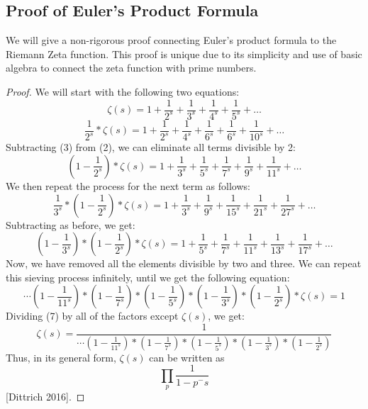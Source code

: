 \documentclass[11pt]{article}
\newcommand\ddfrac[2]{\frac{\displaystyle #1}{\displaystyle #2}}
\begin{document}
\subsection{Proof of Euler's Product Formula}
We will give a non-rigorous proof connecting Euler's product formula to the Riemann Zeta function. This proof is unique due to its simplicity and use of basic algebra to connect the zeta function with prime numbers.
\begin{proof}
We will start with the following two equations:
\begin{equation}  
\zeta(s) = 1 + \frac{1}{2^s} + \frac{1}{3^s} + \frac{1}{4^s} + \frac{1}{5^s} + \ldots
\end{equation}
\begin{equation}  
\frac{1}{2^s}*\zeta(s) = 1 + \frac{1}{2^s} + \frac{1}{4^s} + \frac{1}{6^s} + \frac{1}{6^s} + \frac{1}{10^s}+ \ldots
\end{equation}
Subtracting (3) from (2), we can eliminate all terms divisible by 2:
\begin{equation}  
\left(1-\frac{1}{2^s}\right)*\zeta(s) = 1 + \frac{1}{3^s} + \frac{1}{5^s} + \frac{1}{7^s} + \frac{1}{9^s} + \frac{1}{11^s}+ \ldots
\end{equation}
We then repeat the process for the next term as follows:
\begin{equation}  
\frac{1}{3^s}*\left(1-\frac{1}{2^s}\right)*\zeta(s) = 1 + \frac{1}{3^s} + \frac{1}{9^s} + \frac{1}{15^s} + \frac{1}{21^s} + \frac{1}{27^s}+ \ldots
\end{equation}
Subtracting as before, we get:
\begin{equation}  
\left(1-\frac{1}{3^s}\right)*\left(1-\frac{1}{2^s}\right)*\zeta(s) = 1 + \frac{1}{5^s} + \frac{1}{7^s} + \frac{1}{11^s} + \frac{1}{13^s} + \frac{1}{17^s}+ \ldots
\end{equation}
Now, we have removed all the elements divisible by two and three. We can repeat this sieving process infinitely, until we get the following equation:
\begin{equation}  
\cdots \left(1-\frac{1}{11^s}\right)*\left(1-\frac{1}{7^s}\right)*\left(1-\frac{1}{5^s}\right)*\left(1-\frac{1}{3^s}\right)*\left(1-\frac{1}{2^s}\right)*\zeta(s) = 1 
\end{equation}
Dividing (7) by all of the factors except $\zeta(s)$, we get:
\begin{equation}  
\zeta(s) = \ddfrac{1}{\cdots \left(1-\frac{1}{11^s}\right)*\left(1-\frac{1}{7^s}\right)*\left(1-\frac{1}{5^s}\right)*\left(1-\frac{1}{3^s}\right)*\left(1-\frac{1}{2^s}\right)}
\end{equation} 
Thus, in its general form, $\zeta(s)$ can be written as $$\prod_{p}^{}\frac{1}{1 - p^-s}$$ [Dittrich 2016].
\end{proof}
\end{document}
